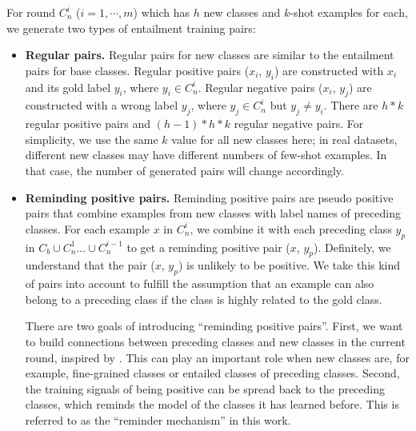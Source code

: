 \documentclass[11pt]{article}
\begin{document}
For round $C_n^i$ ($i=1, \cdots, m$) which has $h$ new classes and $k$-shot examples for each, we generate two types of entailment training pairs: 
\begin{itemize}
    \item \textbf{Regular pairs.} Regular pairs for new classes are similar to the entailment pairs for base classes.
    Regular positive pairs ($x_i$, $y_i$) are constructed with $x_i$ and its gold label $y_i$, where $y_i\in C_n^i$. Regular negative pairs ($x_i$, $y_j$) are constructed with a wrong label $y_j$, where $y_j\in C_n^i$ but $y_j \neq y_i$.
    There are $h*k$ regular positive pairs and $(h-1)*h*k$ regular negative pairs.
    For simplicity, we use the same $k$ value for all new classes here;
    in real datasets, different new classes may have different numbers of few-shot examples. In that case, the number of generated pairs will change accordingly.
    
    \item \textbf{Reminding positive pairs.} %
    Reminding positive pairs are pseudo positive pairs that combine examples from new classes with label names of preceding classes. For each example $x$ in $C_n^i$, we combine it with each preceding class $y_p$ in $C_b \cup C_n^{1} ... \cup  C_n^{i-1}$ to get a reminding positive pair ($x$, $y_p$). Definitely, we understand that the pair ($x$, $y_p$) is unlikely to be positive. We take this kind of pairs into account to fulfill the assumption that an example can also belong to a preceding class if the class is highly related to the gold class.
    
    There are two goals of introducing ``reminding positive pairs''. First, we want to build connections between preceding classes and new classes in the current round, inspired by \cite{DBLPGidarisK18,DBLPRenLFZ19}. This can play an important role when new classes are, for example, fine-grained classes or entailed classes of preceding classes. Second, the training signals of being positive can be spread back to the preceding classes, which reminds the model of the classes it has learned before. This is referred to as the ``reminder mechanism'' in this work.
\end{itemize}
\end{document}
